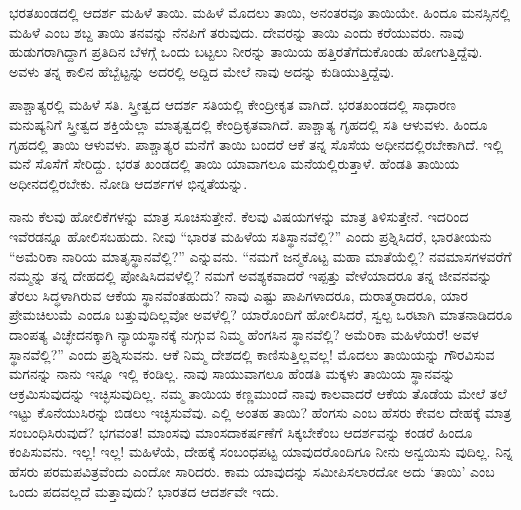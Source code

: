 ಭರತಖಂಡದಲ್ಲಿ ಆದರ್ಶ ಮಹಿಳೆ ತಾಯಿ. ಮಹಿಳೆ ಮೊದಲು ತಾಯಿ, ಅನಂತರವೂ ತಾಯಿಯೇ. ಹಿಂದೂ ಮನಸ್ಸಿನಲ್ಲಿ ಮಹಿಳೆ ಎಂಬ ಶಬ್ದ ತಾಯಿ ತನವನ್ನು ನೆನಪಿಗೆ ತರುವುದು. ದೇವರನ್ನು ತಾಯಿ ಎಂದು ಕರೆಯುವರು. ನಾವು ಹುಡುಗರಾಗಿದ್ದಾಗ ಪ್ರತಿದಿನ ಬೆಳಗ್ಗೆ ಒಂದು ಬಟ್ಟಲು ನೀರನ್ನು ತಾಯಿಯ ಹತ್ತಿರತೆಗೆದುಕೊಂಡು ಹೋಗುತ್ತಿದ್ದೆವು. ಅವಳು ತನ್ನ ಕಾಲಿನ ಹೆಬ್ಬೆಟ್ಟನ್ನು ಅದರಲ್ಲಿ ಅದ್ದಿದ ಮೇಲೆ ನಾವು ಅದನ್ನು ಕುಡಿಯುತ್ತಿದ್ದೆವು.

ಪಾಶ್ಚಾತ್ಯರಲ್ಲಿ ಮಹಿಳೆ ಸತಿ. ಸ್ತ್ರೀತ್ವದ ಆದರ್ಶ ಸತಿಯಲ್ಲಿ ಕೇಂದ್ರೀಕೃತ ವಾಗಿದೆ. ಭರತಖಂಡದಲ್ಲಿ ಸಾಧಾರಣ ಮನುಷ್ಯನಿಗೆ ಸ್ತ್ರೀತ್ವದ ಶಕ್ತಿಯೆಲ್ಲಾ ಮಾತೃತ್ವದಲ್ಲಿ ಕೇಂದ್ರಿಕೃತವಾಗಿದೆ. ಪಾಶ್ಚಾತ್ಯ ಗೃಹದಲ್ಲಿ ಸತಿ ಆಳುವಳು. ಹಿಂದೂ ಗೃಹದಲ್ಲಿ ತಾಯಿ ಆಳುವಳು. ಪಾಶ್ಚಾತ್ಯರ ಮನೆಗೆ ತಾಯಿ ಬಂದರೆ ಆಕೆ ತನ್ನ ಸೊಸೆಯ ಅಧೀನದಲ್ಲಿರಬೇಕಾಗಿದೆ. ಇಲ್ಲಿ ಮನೆ ಸೊಸೆಗೆ ಸೇರಿದ್ದು. ಭರತ ಖಂಡದಲ್ಲಿ ತಾಯಿ ಯಾವಾಗಲೂ ಮನೆಯಲ್ಲಿರುತ್ತಾಳೆ. ಹೆಂಡತಿ ತಾಯಿಯ ಅಧೀನದಲ್ಲಿರಬೇಕು. ನೋಡಿ ಆದರ್ಶಗಳ ಭಿನ್ನತೆಯನ್ನು.

ನಾನು ಕೆಲವು ಹೋಲಿಕೆಗಳನ್ನು ಮಾತ್ರ ಸೂಚಿಸುತ್ತೇನೆ. ಕೆಲವು ವಿಷಯಗಳನ್ನು ಮಾತ್ರ ತಿಳಿಸುತ್ತೇನೆ. ಇದರಿಂದ ಇವೆರಡನ್ನೂ ಹೋಲಿಸಬಹುದು. ನೀವು “ಭಾರತ ಮಹಿಳೆಯ ಸತಿಸ್ಥಾನವೆಲ್ಲಿ?” ಎಂದು ಪ್ರಶ್ನಿಸಿದರೆ, ಭಾರತೀಯನು “ಅಮೆರಿಕಾ ನಾರಿಯ ಮಾತೃಸ್ಥಾನವೆಲ್ಲಿ?” ಎನ್ನುವನು. “ನಮಗೆ ಜನ್ಮಕೊಟ್ಟ ಮಹಾ ಮಾತೆಯೆಲ್ಲಿ? ನವಮಾಸಗಳವರೆಗೆ ನಮ್ಮನ್ನು ತನ್ನ ದೇಹದಲ್ಲಿ ಪೋಷಿಸಿದವಳೆಲ್ಲಿ? ನಮಗೆ ಅವಶ್ಯಕವಾದರೆ ಇಪ್ಪತ್ತು ವೇಳೆಯಾದರೂ ತನ್ನ ಜೀವನವನ್ನು ತೆರಲು ಸಿದ್ಧಳಾಗಿರುವ ಆಕೆಯ ಸ್ಥಾನವೆಂತಹುದು? ನಾವು ಎಷ್ಟು ಪಾಪಿಗಳಾದರೂ, ದುರಾತ್ಮರಾದರೂ, ಯಾರ ಪ್ರೇಮಚಿಲುಮೆ ಎಂದೂ ಬತ್ತುವುದಿಲ್ಲವೋ ಅವಳೆಲ್ಲಿ? ಯಾರೊಂದಿಗೆ ಹೋಲಿಸಿದರೆ, ಸ್ವಲ್ಪ ಒರಟಾಗಿ ಮಾತನಾಡಿದರೂ ದಾಂಪತ್ಯ ವಿಚ್ಛೇದನಕ್ಕಾಗಿ ನ್ಯಾಯಸ್ಥಾನಕ್ಕೆ ನುಗ್ಗುವ ನಿಮ್ಮ ಹೆಂಗಸಿನ ಸ್ಥಾನವೆಲ್ಲಿ? ಅಮೆರಿಕಾ ಮಹಿಳೆಯರೆ! ಅವಳ ಸ್ಥಾನವೆಲ್ಲಿ?” ಎಂದು ಪ್ರಶ್ನಿಸುವನು. ಆಕೆ ನಿಮ್ಮ ದೇಶದಲ್ಲಿ ಕಾಣಿಸುತ್ತಿಲ್ಲವಲ್ಲ! ಮೊದಲು ತಾಯಿಯನ್ನು ಗೌರವಿಸುವ ಮಗನನ್ನು ನಾನು ಇನ್ನೂ ಇಲ್ಲಿ ಕಂಡಿಲ್ಲ. ನಾವು ಸಾಯುವಾಗಲೂ ಹೆಂಡತಿ ಮಕ್ಕಳು ತಾಯಿಯ ಸ್ಥಾನವನ್ನು ಆಕ್ರಮಿಸುವುದನ್ನು ಇಚ್ಛಿಸುವುದಿಲ್ಲ. ನಮ್ಮ ತಾಯಿಯ ಕಣ್ಣಮುಂದೆ ನಾವು ಕಾಲವಾದರೆ ಆಕೆಯ ತೊಡೆಯ ಮೇಲೆ ತಲೆ ಇಟ್ಟು ಕೊನೆಯುಸಿರನ್ನು ಬಿಡಲು ಇಚ್ಛಿಸುವೆವು. ಎಲ್ಲಿ ಅಂತಹ ತಾಯಿ? ಹೆಂಗಸು ಎಂಬ ಹೆಸರು ಕೇವಲ ದೇಹಕ್ಕೆ ಮಾತ್ರ ಸಂಬಂಧಿಸಿರುವುದೆ? ಭಗವಂತ! ಮಾಂಸವು ಮಾಂಸದಾಕರ್ಷಣೆಗೆ ಸಿಕ್ಕಬೇಕೆಂಬ ಆದರ್ಶವನ್ನು ಕಂಡರೆ ಹಿಂದೂ ಕಂಪಿಸುವನು. ಇಲ್ಲ! ಇಲ್ಲ! ಮಹಿಳೆಯೆ, ದೇಹಕ್ಕೆ ಸಂಬಂಧಪಟ್ಟ ಯಾವುದರೊಂದಿಗೂ ನೀನು ಅನ್ವಯಿಸು ವುದಿಲ್ಲ. ನಿನ್ನ ಹೆಸರು ಪರಮಪವಿತ್ರವೆಂದು ಎಂದೋ ಸಾರಿದರು. ಕಾಮ ಯಾವುದನ್ನು ಸಮೀಪಿಸಲಾರದೋ ಅದು ‘ತಾಯಿ’ ಎಂಬ ಒಂದು ಪದವಲ್ಲದೆ ಮತ್ತಾವುದು? ಭಾರತದ ಆದರ್ಶವೇ ಇದು.


